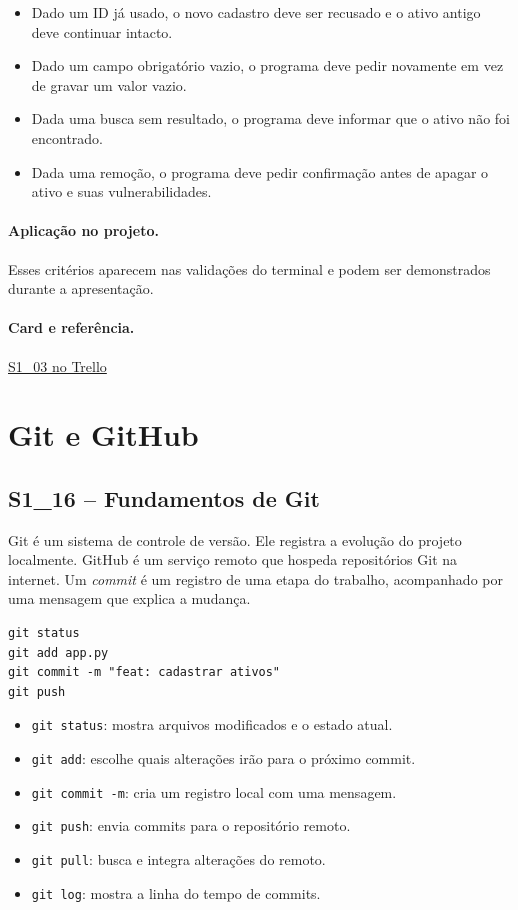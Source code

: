 \documentclass[11pt,a4paper]{article}
\newcommand{\projeto}{\paragraph{Aplicação no projeto.}}
\newcommand{\referencia}[2]{\paragraph{Card e referência.}\href{#1}{#2}}
\newcommand{\cardsection}[1]{\Needspace{12\baselineskip}\subsection{#1}}
\begin{document}
\begin{itemize}
  \item Dado um ID já usado, o novo cadastro deve ser recusado e o ativo antigo deve continuar intacto.
  \item Dado um campo obrigatório vazio, o programa deve pedir novamente em vez de gravar um valor vazio.
  \item Dada uma busca sem resultado, o programa deve informar que o ativo não foi encontrado.
  \item Dada uma remoção, o programa deve pedir confirmação antes de apagar o ativo e suas vulnerabilidades.
\end{itemize}

\projeto
Esses critérios aparecem nas validações do terminal e podem ser demonstrados durante a apresentação.

\referencia{https://trello.com/c/MRXQneEZ}{S1\_03 no Trello}

\section{Git e GitHub}

\cardsection{S1\_16 -- Fundamentos de Git}

Git é um sistema de controle de versão. Ele registra a evolução do projeto localmente. GitHub é um serviço remoto que hospeda repositórios Git na internet. Um \emph{commit} é um registro de uma etapa do trabalho, acompanhado por uma mensagem que explica a mudança.

\begin{lstlisting}[caption={Sequência básica de comandos Git}]
git status
git add app.py
git commit -m "feat: cadastrar ativos"
git push
\end{lstlisting}

\begin{itemize}
  \item \texttt{git status}: mostra arquivos modificados e o estado atual.
  \item \texttt{git add}: escolhe quais alterações irão para o próximo commit.
  \item \texttt{git commit -m}: cria um registro local com uma mensagem.
  \item \texttt{git push}: envia commits para o repositório remoto.
  \item \texttt{git pull}: busca e integra alterações do remoto.
  \item \texttt{git log}: mostra a linha do tempo de commits.
\end{itemize}
\end{document}
